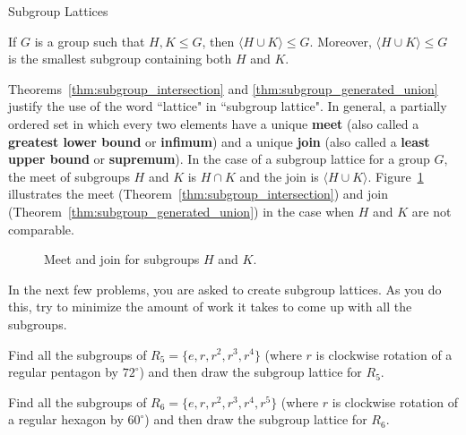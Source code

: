 \begin{section}{Subgroup Lattices}
\begin{theorem}\label{thm:subgroup_generated_union}
If $G$ is a group such that $H,K\leq G$, then $\langle H\cup K\rangle\leq G$. Moreover, $\langle H\cup K\rangle\leq G$ is the smallest subgroup containing both $H$ and $K$.
\end{theorem}

Theorems~\ref{thm:subgroup_intersection} and \ref{thm:subgroup_generated_union} justify the use of the word ``lattice" in ``subgroup lattice".  In general, a partially ordered set in which every two elements have a unique \textbf{meet} (also called a \textbf{greatest lower bound} or \textbf{infimum}) and a unique \textbf{join} (also called a \textbf{least upper bound} or \textbf{supremum}).  In the case of a subgroup lattice for a group $G$, the meet of subgroups $H$ and $K$ is $H\cap K$ and the join is $\langle H\cup K\rangle$.  Figure~\ref{fig:diamond} illustrates the meet (Theorem~\ref{thm:subgroup_intersection}) and join (Theorem~\ref{thm:subgroup_generated_union}) in the case when $H$ and $K$ are not comparable.

\begin{figure}[!ht]
\centering
{}
\caption{Meet and join for subgroups $H$ and $K$.}
\label{fig:diamond}
\end{figure}

In the next few problems, you are asked to create subgroup lattices.  As you do this, try to minimize the amount of work it takes to come up with all the subgroups.

\begin{problem}
Find all the subgroups of $R_5=\{e,r,r^2,r^3,r^4\}$ (where $r$ is clockwise rotation of a regular pentagon by $72^{\circ}$) and then draw the subgroup lattice for $R_5$.
\end{problem}

\begin{problem}
Find all the subgroups of $R_6=\{e,r,r^2,r^3,r^4,r^5\}$ (where $r$ is clockwise rotation of a regular hexagon by $60^{\circ}$) and then draw the subgroup lattice for $R_6$.
\end{problem}


\end{section}
